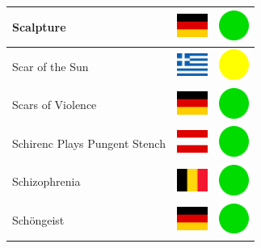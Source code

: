 \documentclass[12pt, a4paper, twoside]{report}
\begin{document}
\begin{center}
\begin{longtable}{|p{5cm}|p{2cm}|p{2cm}|}
 Scalpture                                                  & \includegraphics[width=1cm]{../img/flags/de} &   \includegraphics[width=1cm]{../likes/y} \\ \hline
 Scar of the Sun                                            & \includegraphics[width=1cm]{../img/flags/gr} &   \includegraphics[width=1cm]{../likes/m} \\ \hline
 Scars of Violence                                          & \includegraphics[width=1cm]{../img/flags/de} &   \includegraphics[width=1cm]{../likes/y} \\ \hline
 Schirenc Plays Pungent Stench                              & \includegraphics[width=1cm]{../img/flags/at} &   \includegraphics[width=1cm]{../likes/y} \\ \hline
 Schizophrenia                                              & \includegraphics[width=1cm]{../img/flags/be} &   \includegraphics[width=1cm]{../likes/y} \\ \hline
 Schöngeist                                                 & \includegraphics[width=1cm]{../img/flags/de} &   \includegraphics[width=1cm]{../likes/y} \\ \hline

\end{longtable}
\end{center}
\end{document}
